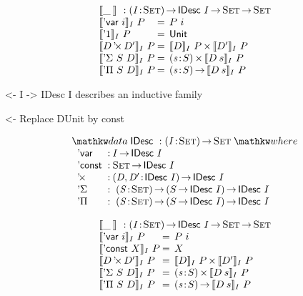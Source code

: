 \documentclass[preprint, authoryear, onecolumn]{sigplanconf}
\newenvironment{structure}{\footnotesize\verbatim}{\endverbatim}
\begin{document}
\[\stk{
\idescop{\_\:}{}{} : \PI{\V{I}}{\Set} \IDesc{I} \To \Set \To \Set          \\
\begin{array}{@{}l@{\:=\:\:}ll}
\idescop{\DVar{i}}{I}{P}      &  P~i                                         \\
\idescop{\DUnit}{I}{P}        &  \Unit                                       \\
\idescop{\DProd{D}{D'}}{I}{P} &  \TIMES{\idescop{D}{I}{P}}{\idescop{D'}{I}{P}}       \\
\idescop{\DSigma{S}{D}}{I}{P} &  \SIGMA{\V{s}}{S} \idescop{D\: s}{I}{P}                \\
\idescop{\DPi{S}{D}}{I}{P}    &  \PI{\V{s}}{S} \idescop{D\: s}{I}{P}            
\end{array}
}\]

\begin{structure}
<- I -> IDesc I describes an inductive family
\end{structure}

\begin{structure}
<- Replace DUnit by const
\end{structure}


\[
\stk{
\data \IDesc{} : \PI{\V{I}}{\Set} \Set \where \\
\;\;\begin{array}{@{}l@{\::\:}l@{\quad}l}
    \DVar{}         & I \To \IDesc{I}                                   \\
    \DConst{}       & \Set \To \IDesc{I}                                \\
    \DProd{}{}      & \PI{\V{D}, \V{D'}}{\IDesc{I}} \IDesc{I}           \\
    \DSigma         & \PI{\V{S}}{\Set} \PIS{S \To \IDesc{I}} \IDesc{I}  \\
    \DPi            & \PI{\V{S}}{\Set} \PIS{S \To \IDesc{I}} \IDesc{I} 
\end{array}
}
\]


\[\stk{
\idescop{\_\:}{}{} : \PI{\V{I}}{\Set} \IDesc{I} \To \Set \To \Set                  \\
\begin{array}{@{}l@{\:=\:\:}ll}
\idescop{\DVar{i}}{I}{P}      &  P~i                                                 \\
\idescop{\DConst{X}}{I}{P}    &  X                                                   \\
\idescop{\DProd{D}{D'}}{I}{P} &  \TIMES{\idescop{D}{I}{P}}{\idescop{D'}{I}{P}}       \\
\idescop{\DSigma{S}{D}}{I}{P} &  \SIGMA{\V{s}}{S} \idescop{D\: s}{I}{P}                    \\
\idescop{\DPi{S}{D}}{I}{P}    &  \PI{\V{s}}{S} \idescop{D\: s}{I}{P}            
\end{array}
}\]
\end{document}
